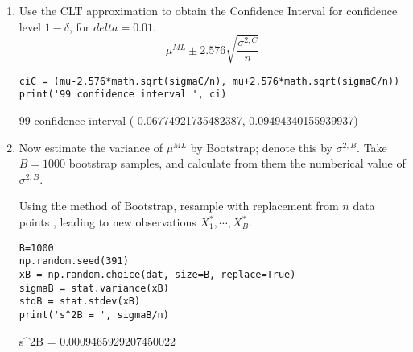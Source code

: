 \documentclass[preprint,12pt]{elsarticle}
\begin{document}
\begin{enumerate}[label=\alph*]
        \item Use the CLT approximation to obtain the Confidence Interval for
        confidence level $1-\delta$, for $delta=0.01$.
        \begin{equation*}
            \mu^{ML} \pm 2.576\sqrt{\frac{\sigma^{2,C}}{n}}
        \end{equation*}
        \begin{lstlisting}
ciC = (mu-2.576*math.sqrt(sigmaC/n), mu+2.576*math.sqrt(sigmaC/n))
print('99 confidence interval ', ci) 
        \end{lstlisting}
        \begin{spverbatim}
99 confidence interval  (-0.06774921735482387, 0.09494340155939937)
        \end{spverbatim}

        \item Now estimate the variance of $\mu^{ML}$ by Bootstrap; denote this
        by $\sigma^{2,B}$. Take $B=1000$ bootstrap samples, and calculate from
        them the numberical value of $\sigma^{2,B}$.

        Using the method of Bootstrap, resample with replacement from $n$ data points
        , leading to new observations $X_1^{*},\cdots,X_B^{*}$.
        \begin{lstlisting}
B=1000
np.random.seed(391)
xB = np.random.choice(dat, size=B, replace=True)
sigmaB = stat.variance(xB)
stdB = stat.stdev(xB)
print('s^2B = ', sigmaB/n)
        \end{lstlisting}
        \begin{spverbatim}
s^2B =  0.0009465929207450022
        \end{spverbatim}


\end{enumerate}
\end{document}
